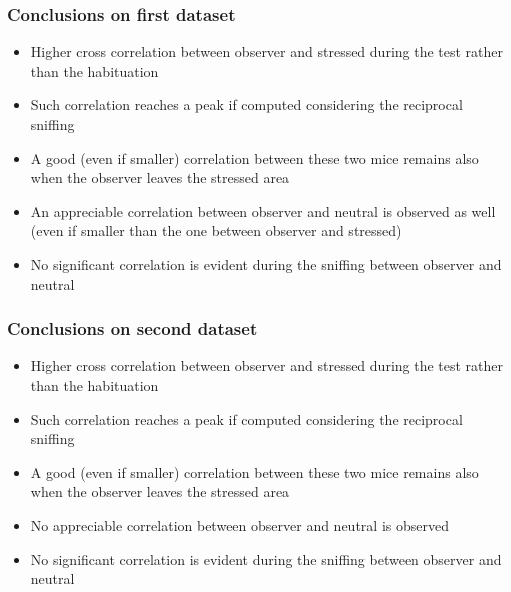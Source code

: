 \documentclass{beamer}
\begin{document}
\begin{frame}
\frametitle{Conclusions on first dataset}


\begin{itemize}
	
	\item Higher cross correlation between observer and stressed during the test rather than the habituation
	
	\item Such correlation reaches a peak if computed considering the reciprocal sniffing 
	
	\item  A good (even if smaller) correlation between these two mice remains also when the observer leaves the stressed area
	
	\item An appreciable correlation between observer and neutral is observed as well (even if smaller than the one between observer and stressed)
	
	\item No significant correlation is evident during the sniffing between observer and neutral
	
\end{itemize}

\end{frame}



\begin{frame}
\frametitle{Conclusions on second dataset}



\begin{itemize}
	
	\item Higher cross correlation between observer and stressed during the test rather than the habituation
	
	\item Such correlation reaches a peak if computed considering the reciprocal sniffing 
	
	\item  A good (even if smaller) correlation between these two mice remains also when the observer leaves the stressed area
	
	\item No appreciable correlation between observer and neutral is observed 
	
	\item No significant correlation is evident during the sniffing between observer and neutral
	
\end{itemize}

\end{frame}
\end{document}

